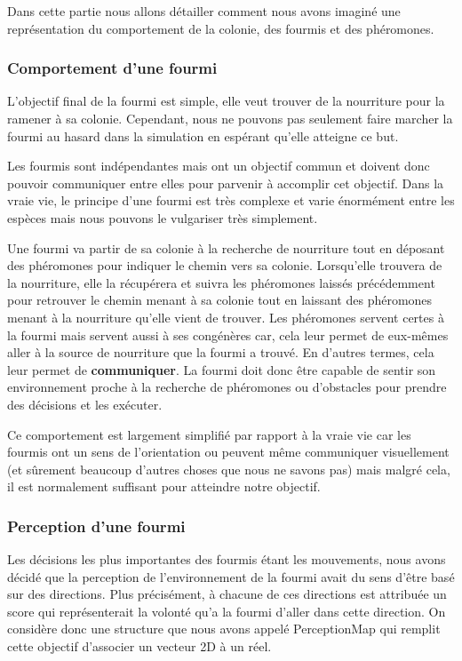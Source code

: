 \documentclass{EPUProjetDi}
\begin{document}
Dans cette partie nous allons détailler comment nous avons imaginé une représentation du comportement de la colonie, des fourmis et des phéromones.

\subsubsection{Comportement d'une fourmi}

L'objectif final de la fourmi est simple, elle veut trouver de la nourriture pour la ramener à sa colonie. Cependant, nous ne pouvons pas seulement
faire marcher la fourmi au hasard dans la simulation en espérant qu'elle atteigne ce but. 

Les fourmis sont indépendantes mais ont un objectif commun et doivent donc pouvoir communiquer entre elles pour parvenir à accomplir cet objectif.
Dans la vraie vie, le principe d'une fourmi est très complexe et varie énormément entre les espèces mais nous pouvons le vulgariser très simplement.

Une fourmi va partir de sa colonie à la recherche de nourriture tout en déposant des phéromones pour indiquer le chemin vers sa colonie. Lorsqu'elle 
trouvera de la nourriture, elle la récupérera et suivra les phéromones laissés précédemment pour retrouver le chemin menant à sa colonie tout en laissant
des phéromones menant à la nourriture qu'elle vient de trouver.  Les phéromones servent certes à la fourmi mais servent aussi à ses congénères car, 
cela leur permet de eux-mêmes aller à la source de nourriture que la fourmi a trouvé. En d'autres termes, cela leur permet de \textbf{communiquer}.
La fourmi doit donc être capable de sentir son environnement proche à la recherche de phéromones ou d'obstacles pour prendre des décisions et les exécuter.

Ce comportement est largement simplifié par rapport à la vraie vie car les fourmis ont un sens de l'orientation ou peuvent même communiquer visuellement 
(et sûrement beaucoup d'autres choses que nous ne savons pas) mais malgré cela, il est normalement suffisant pour atteindre notre objectif. 


\subsubsection{Perception d'une fourmi}

Les décisions les plus importantes des fourmis étant les mouvements, nous avons décidé que la perception de l'environnement de la fourmi avait du sens
d'être basé sur des directions.
Plus précisément, à chacune de ces directions est attribuée un score qui représenterait la volonté qu'a la fourmi d'aller dans cette direction.
On considère donc une structure que nous avons appelé PerceptionMap qui remplit cette objectif d'associer un vecteur 2D à un réel.
\end{document}
